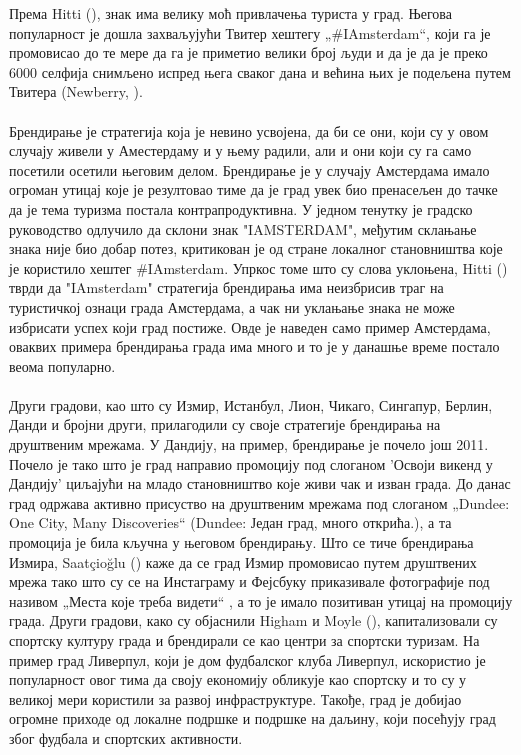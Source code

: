 \documentclass{article}
\begin{document}
Према Hitti (\cite{hitti_2018}), знак има велику моћ привлачења туриста у град. Његова популарност је дошла захваљујући Твитер хештегу „#IAmsterdam“, који га је промовисао до те мере да га је приметио велики број људи и да је да је преко 6000 селфија снимљено испред њега сваког дана и већина њих је подељена путем Твитера (Newberry, \cite{nb_2016}). \\\\
Брендирање је стратегија која је невино усвојена, да би се они, који су у овом случају живели у Аместердаму и у њему радили, али и они који су га само посетили осетили његовим делом. Брендирање је у случају Амстердама имало огроман утицај које је резултовао тиме да је град увек био пренасељен до тачке да је тема туризма постала контрапродуктивна. У једном тенутку је градско руководство одлучило да склони знак "IAMSTERDAM", међутим склањање знака није био добар потез, критикован је од стране локалног становништва које је користило хештег #IAmsterdam. Упркос томе што су слова уклоњена, Hitti (\cite{hitti_2018}) тврди да "IAmsterdam" стратегија брендирања има неизбрисив траг на туристичкој ознаци града Амстердама, а чак ни уклањање знака не може избрисати успех који град постиже. Овде је наведен само пример Амстердама, оваквих примера брендирања града има много и то је у данашње време постало веома популарно.
\\\\
Други градови, као што су Измир, Истанбул, Лион, Чикаго, Сингапур, Берлин, Данди и бројни други, прилагодили су своје стратегије брендирања на друштвеним мрежама. У Дандију, на пример, брендирање је почело још 2011. Почело је тако што је град направио промоцију под слоганом 'Освоји викенд у Дандију' циљајући на младо становништво које живи чак и изван града. До данас град одржава активно присуство на друштвеним мрежама под слоганом „Dundee: One City, Many Discoveries“ (Dundee: Један град, много открића.), а  та промоција је била кључна у његовом брендирању. Што се тиче брендирања Измира, Saatçioğlu (\cite{sa_2017}) каже да се град Измир промовисао путем друштвених мрежа тако што су се на Инстаграму и Фејсбуку приказивале фотографије под називом „Места које треба видети“ , а то је имало позитиван утицај на промоцију града. Други градови, како су објаснили Higham и Moyle (\cite{hm_2016}), капитализовали су спортску културу града и брендирали се као центри за спортски туризам. На пример град Ливерпул, који је дом фудбалског клуба Ливерпул, искористио је популарност овог тима да своју економију обликује као спортску и то су у великој мери користили за развој инфраструктуре. Такође, град је добијао огромне приходе од локалне подршке и подршке на даљину, који посећују град због фудбала и спортских активности.
\end{document}

